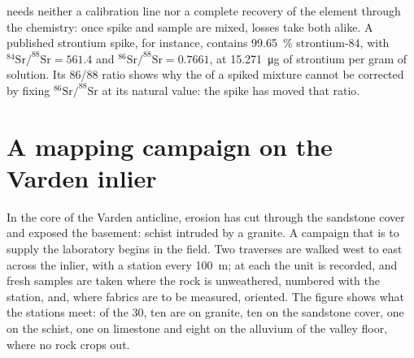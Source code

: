  needs neither a calibration line nor a complete recovery of the element through
the chemistry: once spike and sample are mixed, losses take both alike. A published strontium
spike, for instance, contains \qty{99.65}{\percent} strontium-84, with
$^{84}\mathrm{Sr}/^{88}\mathrm{Sr} = 561.4$ and $^{86}\mathrm{Sr}/^{88}\mathrm{Sr} = 0.7661$, at
\qty{15.271}{\micro\gram} of strontium per gram of solution. Its 86/88 ratio shows why the  of a spiked mixture cannot be corrected by fixing $^{86}\mathrm{Sr}/^{88}\mathrm{Sr}$ at its
natural value: the spike has moved that ratio.

\section{A mapping campaign on the Varden inlier}\label{sec:b2:field-lab-methods-2:campaign}

In the core of the Varden anticline, erosion has cut through the sandstone cover and exposed the
basement: schist intruded by a granite. A campaign that is to supply the laboratory begins in the
field. Two traverses are walked west to east across the inlier, with a station every
\qty{100}{m}; at each the unit is recorded, and fresh samples are taken where the rock is
unweathered, numbered with the station, and, where fabrics are to be measured, oriented. The figure
shows what the stations meet: of the 30, ten are on granite, ten on the sandstone cover, one on
the schist, one on limestone and eight on the alluvium of the valley floor, where no rock crops
out.

